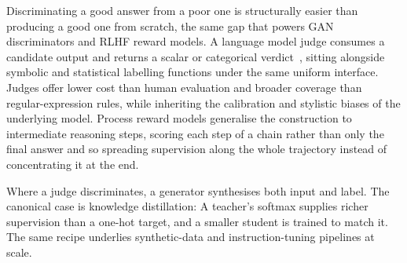 
Discriminating a good answer from a poor one is structurally easier than producing a good one from scratch,
the same gap that powers GAN discriminators and RLHF reward models.
A language model judge consumes a candidate output and returns a scalar or categorical verdict~\cite{Zheng2023JudgeBench},
sitting alongside symbolic and statistical labelling functions under the same uniform interface.
Judges offer lower cost than human evaluation and broader coverage than regular-expression rules,
while inheriting the calibration and stylistic biases of the underlying model.
Process reward models generalise the construction to intermediate reasoning steps,
scoring each step of a chain rather than only the final answer
and so spreading supervision along the whole trajectory instead of concentrating it at the end.

Where a judge discriminates, a generator synthesises both input and label.
The canonical case is knowledge distillation:
A teacher's softmax supplies richer supervision than a one-hot target,
and a smaller student is trained to match it.
The same recipe underlies synthetic-data and instruction-tuning pipelines at scale.


